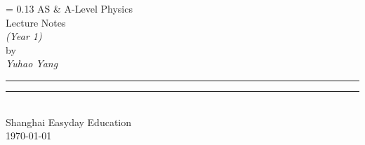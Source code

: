 \newlength{\drop}

\begingroup
\drop = 0.13\textheight
\centering
\vspace*{\drop}
{\Huge AS \& A-Level Physics}\\[\baselineskip]
{\Huge Lecture Notes}\\[1.5\baselineskip]
{\Huge\itshape (Year 1)}\\[3\baselineskip]
{\Large\sc by}\\[0.5\baselineskip]
{\Large \textit{Yuhao Yang}} \\
\par
\vfill
{\color{cyan} \rule{\textwidth}{0.4pt}\vspace*{-\baselineskip}\vspace{3pt}
	\rule{\textwidth}{0.4pt}} \\[\baselineskip]
{\Large Shanghai Easyday Education} \\[0.5\baselineskip]
{\Large \today}\par
\vspace*{\drop}
\endgroup